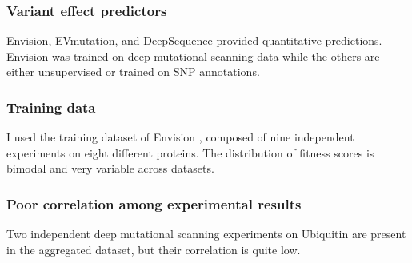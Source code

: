\documentclass[10pt, british]{beamer}
\begin{document}
\begin{frame}
	\frametitle{Variant effect predictors}
	\begin{figure}
		
	\end{figure}
	\vfill%
	Envision, EVmutation, and DeepSequence provided quantitative predictions.
	Envision was trained on deep mutational scanning data while the others are either unsupervised or trained on SNP annotations.
\end{frame}

\begin{frame}
	\frametitle{Training data}
	I used the training dataset of Envision \parencite{Gray2018}, composed of nine independent experiments on eight different proteins.
	The distribution of fitness scores is bimodal and very variable across datasets.
	\vfill%
	\centering%
	
	
\end{frame}

\begin{frame}
	\frametitle{Poor correlation among experimental results}
	Two independent deep mutational scanning experiments on Ubiquitin are present in the aggregated dataset, but their correlation is quite low.
	\vfill%
	\centering%
	
\end{frame}
\end{document}
